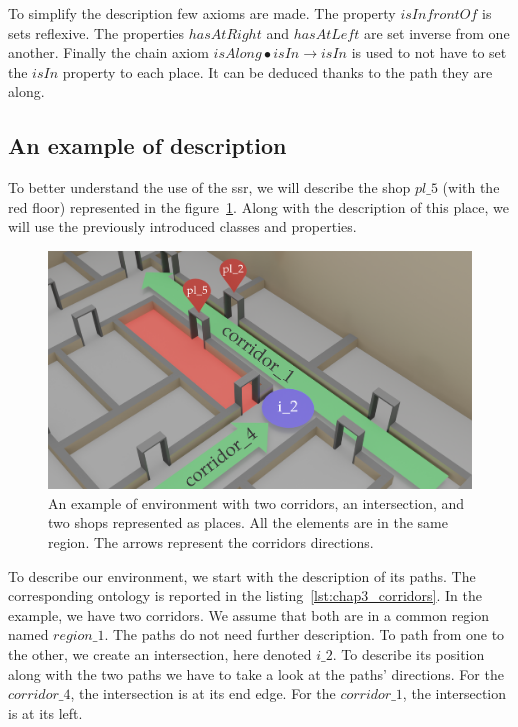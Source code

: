 To simplify the description few axioms are made. The property $isInfrontOf$ is sets reflexive. The properties $hasAtRight$ and $hasAtLeft$ are set inverse from one another. Finally the chain axiom $isAlong \bullet isIn \rightarrow isIn$ is used to not have to set the $isIn$ property to each place. It can be deduced thanks to the path they are along.

\subsection{An example of description}

To better understand the use of the \acrshort{ssr}, we will describe the shop $pl\_5$ (with the red floor) represented in the figure~\ref{fig:chap3_example}. Along with the description of this place, we will use the previously introduced classes and properties.

\begin{figure}[ht!]
\centering
\includegraphics[scale=0.16]{figures/chapter3/SSR_example.png}
\caption{\label{fig:chap3_example} An example of environment with two corridors, an intersection, and two shops represented as places. All the elements are in the same region. The arrows represent the corridors directions.}
\end{figure}

To describe our environment, we start with the description of its paths. The corresponding ontology is reported in the listing~\ref{lst:chap3_corridors}. In the example, we have two corridors. We assume that both are in a common region named $region\_1$. The paths do not need further description. To path from one to the other, we create an intersection, here denoted $i\_2$. To describe its position along with the two paths we have to take a look at the paths' directions. For the $corridor\_4$, the intersection is at its end edge. For the $corridor\_1$, the intersection is at its left.

